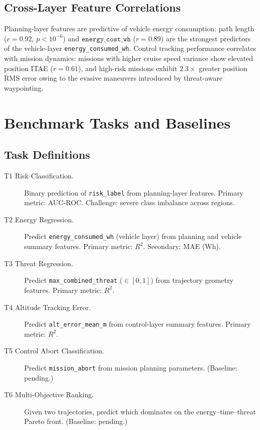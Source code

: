 ﻿\documentclass{article}
\begin{document}
\subsection{Cross-Layer Feature Correlations}

Planning-layer features are predictive of vehicle energy consumption:
path length ($r = 0.92$, $p < 10^{-6}$) and $\texttt{energy\_cost\_wh}$
($r = 0.89$) are the strongest predictors of the vehicle-layer
\texttt{energy\_consumed\_wh}.
Control tracking performance correlates with mission dynamics:
missions with higher cruise speed variance show elevated position ITAE
($r = 0.61$), and high-risk missions exhibit $2.3\times$ greater position
RMS error owing to the evasive maneuvers introduced by threat-aware waypointing.

\section{Benchmark Tasks and Baselines}
\label{sec:benchmarks}

\subsection{Task Definitions}

\begin{description}
  \item[T1 Risk Classification.] Binary prediction of \texttt{risk\_label}
    from planning-layer features. Primary metric: AUC-ROC.
    Challenge: severe class imbalance across regions.
  \item[T2 Energy Regression.] Predict \texttt{energy\_consumed\_wh}
    (vehicle layer) from planning and vehicle summary features.
    Primary metric: $R^2$. Secondary: MAE (Wh).
  \item[T3 Threat Regression.] Predict \texttt{max\_combined\_threat}
    ($\in [0,1]$) from trajectory geometry features.
    Primary metric: $R^2$.
  \item[T4 Altitude Tracking Error.] Predict \texttt{alt\_error\_mean\_m}
    from control-layer summary features. Primary metric: $R^2$.
  \item[T5 Control Abort Classification.] Predict \texttt{mission\_abort}
    from mission planning parameters. (Baseline: pending.)
  \item[T6 Multi-Objective Ranking.] Given two trajectories, predict
    which dominates on the energy--time--threat Pareto front.
    (Baseline: pending.)
\end{description}
\end{document}
